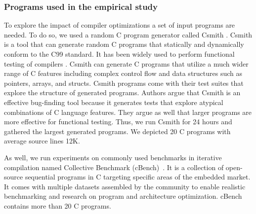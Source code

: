 \subsubsection{Programs used in the empirical study}
To explore the impact of compiler optimizations a set of input programs are needed. 
To do so, we used a random C program generator called Csmith \cite{yang2011finding}.
Csmith is a tool that can generate random C programs that statically and dynamically conform to the C99 standard. It has been widely used to perform functional testing of compilers \cite{le2014compiler} \cite{nagai2013scaling}. Csmith can generate C programs that utilize a much wider range of C features including complex control flow and data structures such as pointers, arrays, and structs. Csmith programs come with their test suites that explore the structure of generated programs. 
Authors argue that Csmith is an effective bug-finding tool because it generates tests that explore atypical combinations of C language features. They argue as well that larger programs are more effective for functional testing. Thus, we run Csmith for 24 hours and gathered the largest generated programs. We depicted 20 C programs with average source lines 12K.

As well, we run experiments on commonly used benchmarks in iterative compilation named Collective Benchmark (cBench)~\cite{fursin2009collective}. It is a collection of open-source sequential programs in C targeting specific areas of the embedded market. It comes with multiple datasets assembled by the community to enable realistic benchmarking and research on program and architecture optimization. cBench contains more than 20 C programs. 

